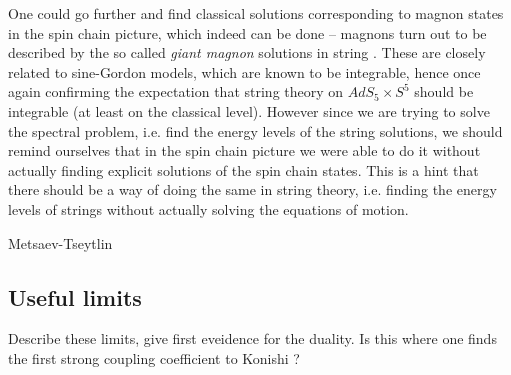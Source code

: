 One could go further and find classical solutions corresponding to magnon states in the spin chain picture, which indeed can be done -- magnons turn out to be described by the so called \emph{giant magnon} solutions in string . These are closely related to sine-Gordon models, which are known to be integrable, hence once again confirming the expectation that string theory on $AdS_5 \times S^5$ should be integrable (at least on the classical level). However since we are trying to solve the spectral problem, i.e. find the energy levels of the string solutions, we should remind ourselves that in the spin chain picture we were able to do it without actually finding explicit solutions of the spin chain states. This is a hint that there should be a way of doing the same in string theory, i.e. finding the energy levels of strings without actually solving the equations of motion. 

Metsaev-Tseytlin

\subsection{Useful limits}

Describe these limits, give first eveidence for the duality. Is this where one finds the first strong coupling coefficient to Konishi ?